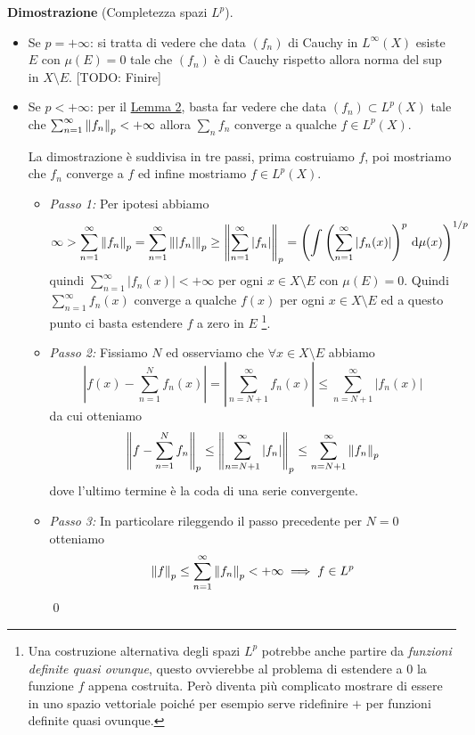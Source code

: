\textbf{Dimostrazione} (Completezza spazi $L^p$).
\begin{itemize}
	\item 
		Se $p = +\infty$: si tratta di vedere che data $(f_n)$ di Cauchy in $L^\infty(X)$ esiste $E$ con $\mu(E) = 0$ tale che $(f_n)$ è di Cauchy rispetto allora norma del sup in $X \setminus E$. [TODO: Finire]

	\item 
		Se $p < +\infty$: per il \hyperlink{prop:completeness_lemma_2}{Lemma 2}, basta far vedere che data $(f_n) \subset L^p(X)$ tale che $\sum_{n=1}^\infty \left\lVert f_n \right\rVert_p < +\infty$ allora $\sum_n f_n$ converge a qualche $f \in L^p(X)$.

		La dimostrazione è suddivisa in tre passi, prima costruiamo $f$, poi mostriamo che $f_n$ converge a $f$ ed infine mostriamo $f \in L^p(X)$.

		\begin{itemize}
			\item 
				\textit{Passo 1:} 
				Per ipotesi abbiamo
				$$
				\infty 
				> \sum_{n=1}^\infty \left\lVert f_n \right\rVert_p 
				= \sum_{n=1}^\infty \left\lVert |f_n| \right\rVert_p 
				\geq \left\lVert \sum_{n=1}^\infty |f_n| \right\rVert_p 
				= \left( \int \left( \sum_{n=1}^\infty |f_n(x)| \right)^p \,\mathrm{d} \mu(x) \right)^{1/p}
				$$
				quindi $\sum_{n=1}^\infty |f_n(x)| < +\infty$ per ogni $x \in X \setminus E$ con $\mu(E) = 0$. Quindi $\sum_{n=1}^\infty f_n(x)$ converge a qualche $f(x)$ per ogni $x \in X \setminus E$ ed a questo punto ci basta estendere $f$ a zero in $E$ \footnote{Una costruzione alternativa degli spazi $L^p$ potrebbe anche partire da \textit{funzioni definite quasi ovunque}, questo ovvierebbe al problema di estendere a $0$ la funzione $f$ appena costruita. Però diventa più complicato mostrare di essere in uno spazio vettoriale poiché per esempio serve ridefinire $+$ per funzioni definite quasi ovunque.}.
			
			\item 
				\textit{Passo 2:}
				Fissiamo $N$ ed osserviamo che $\forall x \in X \setminus E$ abbiamo
				$$
				\left| f(x) - \sum_{n=1}^N f_n(x) \right| 
				= \left| \sum_{n=N+1}^\infty f_n(x) \right| 
				\leq \sum_{n=N+1}^\infty |f_n(x)|
				$$
				da cui otteniamo
				$$
				\left\lVert f - \sum_{n=1}^N f_n \right\rVert_p 
				\leq \left\lVert \sum_{n=N+1}^\infty |f_n| \right\rVert_p
				\leq \sum_{n=N+1}^\infty \left\lVert f_n \right\rVert_p
				$$
				dove l'ultimo termine è la coda di una serie convergente.
			
			\item 
				\textit{Passo 3:}
				In particolare rileggendo il passo precedente per $N = 0$ otteniamo
				$$
				\left\lVert f \right\rVert_p \leq \sum_{n=1}^\infty \left\lVert f_n \right\rVert_p < +\infty \implies f \in L^p
				$$
				\qed

		\end{itemize}
\end{itemize}

